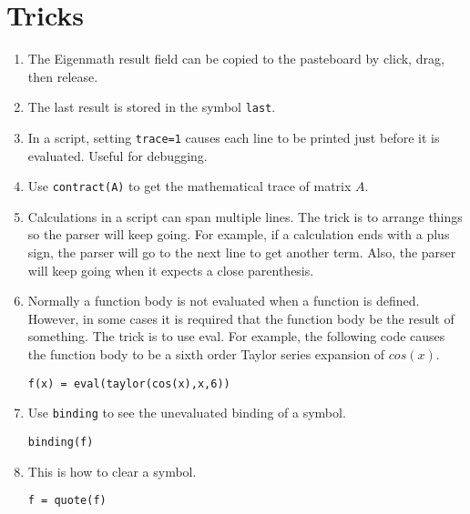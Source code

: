 
\section{Tricks}
\begin{enumerate}

\item
The Eigenmath result field can be copied to the pasteboard by
click, drag, then release.

\item
The last result is stored in the symbol {\tt last}.

\item
In a script, setting {\tt trace=1}
causes each line to be printed just before it is evaluated.
Useful for debugging.

\item
Use {\tt contract(A)} to get the mathematical trace of matrix $A$.

\item
Calculations in a script can span multiple lines.
The trick is to arrange things so the parser will keep going.
For example, if a calculation ends with a plus sign, the parser will go to the next line to get another term.
Also, the parser will keep going when it expects a close parenthesis.

\item
Normally a function body is not evaluated when a function is defined.
However, in some cases it is required that the function body be the result of something.
The trick is to use eval.
For example, the following code causes the function body to be a sixth order Taylor series expansion of $cos(x)$.

\begin{Verbatim}[formatcom=\color{blue}]
f(x) = eval(taylor(cos(x),x,6))
\end{Verbatim}

\item
Use {\tt binding} to see the unevaluated binding of a symbol.

\begin{Verbatim}[formatcom=\color{blue}]
binding(f)
\end{Verbatim}

\item
This is how to clear a symbol.

\begin{Verbatim}[formatcom=\color{blue}]
f = quote(f)
\end{Verbatim}

\end{enumerate}
